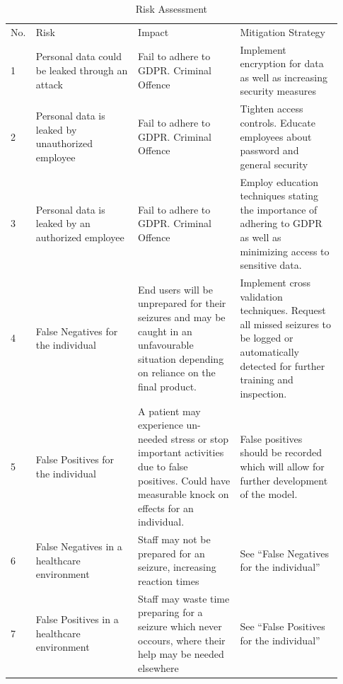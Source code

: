 \documentclass[12pt]{article}
\begin{document}
\begin{table}[H]
\centering
\begin{tabular}{p{0.03\linewidth}p{0.3\linewidth}p{0.3\linewidth}p{0.3\linewidth}}
No. & Risk                                              & Impact                                                                                                                                                   & Mitigation Strategy                                                                                                                           \\
1 & Personal data could be leaked through an attack   & Fail to adhere to GDPR. Criminal Offence                                                                                                                 & Implement encryption for data as well as increasing security measures                                                                          \\
2 & Personal data is leaked by unauthorized employee  & Fail to adhere to GDPR. Criminal Offence                                                                                                                 & Tighten access controls. Educate employees about password and general security                                                                 \\
3 & Personal data is leaked by an authorized employee & Fail to adhere to GDPR. Criminal Offence                                                                                                                 & Employ education techniques stating the importance of adhering to GDPR as well as minimizing access to sensitive data.                        \\
4 & False Negatives for the individual                                   & End users will be unprepared for their seizures and may be caught in an unfavourable situation depending on reliance on the final product.               & Implement cross validation techniques. Request all missed seizures to be logged or automatically detected for further training and inspection. \\
5 & False Positives for the individual                                  & A patient may experience un-needed stress or stop important activities due to false positives. Could have measurable knock on effects for an individual. & False positives should be recorded which will allow for further development of the model.                                                      \\
6 & False Negatives in a healthcare environment & Staff may not be prepared for an seizure, increasing reaction times & See ``False Negatives for the individual''\\
7 & False Positives in a healthcare environment & Staff may waste time preparing for a seizure which never occours, where their help may be needed elsewhere & See ``False Positives for the individual'' 
\end{tabular}
\caption{Risk Assessment}
\label{tab:risk-assessment}
\end{table}
\end{document}
